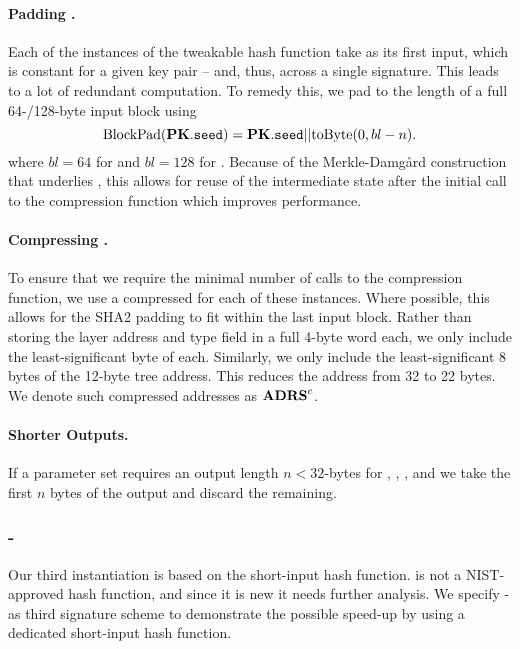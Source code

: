    \paragraph{Padding \pseed.} Each of the instances of the tweakable hash function take \pseed as its first input, which is constant for a given key pair -- and, thus, across a single signature.
   This leads to a lot of redundant computation. To remedy this, we pad \pseed to the length of a full 64-/128-byte \shatwo input block using
  \begin{equation*}
      \text{BlockPad}(\mathbf{PK}.\texttt{seed}) = \mathbf{PK}.\texttt{seed} || \text{toByte}(0, bl - n).
   \end{equation*}
   where $bl= 64$ for \shatwofs and $bl = 128$ for \shatwofivetwelve.
   Because of the Merkle-Damg\aa{}rd construction that underlies \shatwo, this allows for reuse of the intermediate \shatwo state after the initial call to the compression function 
   which improves performance.

   \paragraph{Compressing \adrs.} To ensure that we require the minimal number of calls to the \shatwo compression function, we use a compressed \adrs for each of these instances. Where possible, this allows for the SHA2 padding to fit within the last input block. Rather than storing the layer address and type field in a full 4-byte word each, we only include the least-significant byte of each. Similarly, we only include the least-significant 8 bytes of the 12-byte tree address. This reduces the address from 32 to 22 bytes. We denote such compressed addresses as $\textbf{ADRS}^{c}$.

   \paragraph{Shorter Outputs.} If a parameter set requires an 
   output length $n < 32$-bytes for \sphincsF, \sphincsH, \sphincsPRF, and 
   \sphincsPRFmsg we take the first $n$ bytes of the output and discard the 
   remaining.

\subsubsection{\spx-\haraka}
   Our third instantiation is based on the \haraka short-input hash function. 
   \haraka is not a NIST-approved hash function,
   and since it is new it needs further analysis.
   We specify \spx-\haraka as
   third signature scheme to demonstrate the possible speed-up by using a 
   dedicated short-input hash function.
   
